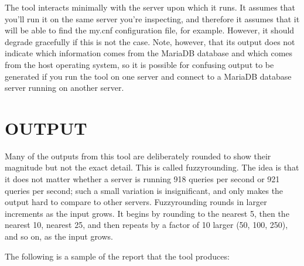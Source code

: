\documentclass[letterpaper,10pt,english]{sphinxmanual}
\begin{document}
The tool interacts minimally with the server upon which it runs.  It assumes
that you’ll run it on the same server you’re inspecting, and therefore it
assumes that it will be able to find the my.cnf configuration file, for example.
However, it should degrade gracefully if this is not the case.  Note, however,
that its output does not indicate which information comes from the MariaDB
database and which comes from the host operating system, so it is possible for
confusing output to be generated if you run the tool on one server and connect
to a MariaDB database server running on another server.


\section{OUTPUT}
\label{\detokenize{mariadb-database-summary:output}}
Many of the outputs from this tool are deliberately rounded to show their
magnitude but not the exact detail.  This is called fuzzy\sphinxhyphen{}rounding. The idea
is that it does not matter whether a server is running 918 queries per second
or 921 queries per second; such a small variation is insignificant, and only
makes the output hard to compare to other servers.  Fuzzy\sphinxhyphen{}rounding rounds in
larger increments as the input grows.  It begins by rounding to the nearest 5,
then the nearest 10, nearest 25, and then repeats by a factor of 10 larger
(50, 100, 250), and so on, as the input grows.

The following is a sample of the report that the tool produces:
\end{document}
